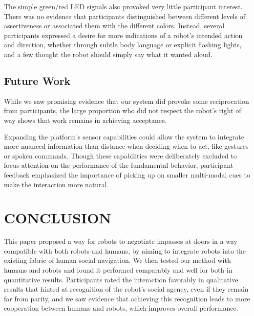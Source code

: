 \documentclass[letterpaper, 10 pt, conference]{ieeeconf}  %
\begin{document}
The simple green/red LED signals also provoked very little participant interest. There was no evidence that participants distinguished between different levels of assertiveness or associated them with the different colors. Instead, several participants expressed a desire for more indications of a robot’s intended action and direction, whether through subtle body language or explicit flashing lights, and a few thought the robot should simply say what it wanted aloud. 

\subsection{Future Work}

While we saw promising evidence that our system did provoke some reciprocation from participants, the large proportion who did not respect the robot's right of way shows that work remains in achieving acceptance. 

Expanding the platform’s sensor capabilities could allow the system to integrate more nuanced information than distance when deciding when to act, like gestures or spoken commands. Though these capabilities were deliberately excluded to focus attention on the performance of the fundamental behavior, participant feedback emphasized the importance of picking up on smaller multi-modal cues to make the interaction more natural.


\section{CONCLUSION}

This paper proposed a way for robots to negotiate impasses at doors in a way compatible with both robots and humans, by aiming to integrate robots into the existing fabric of human social navigation. We then tested our method with humans and robots and found it performed comparably and well for both in quantitative results. Participants rated the interaction favorably in qualitative results that hinted at recognition of the robot’s social agency, even if they remain far from parity, and we saw evidence that achieving this recognition leads to more cooperation between humans and robots, which improves overall performance.
\end{document}
